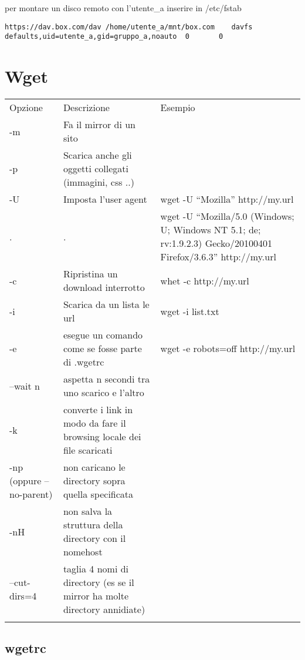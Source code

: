 \documentclass[]{article}
\begin{document}
per montare un disco remoto con l'utente\_a inserire in /etc/fstab

\begin{verbatim}
https://dav.box.com/dav /home/utente_a/mnt/box.com    davfs   defaults,uid=utente_a,gid=gruppo_a,noauto  0       0
\end{verbatim}

\section{Wget}\label{wget}

\begin{longtable}[l]{@{}lll@{}}
\toprule\addlinespace
Opzione & Descrizione & Esempio
\\\addlinespace
\midrule\endhead
-m & Fa il mirror di un sito
\\\addlinespace
-p & Scarica anche gli oggetti collegati (immagini, css ..)
\\\addlinespace
-U & Imposta l'user agent & wget -U ``Mozilla'' http://my.url
\\\addlinespace
. & . & wget -U ``Mozilla/5.0 (Windows; U; Windows NT 5.1; de;
rv:1.9.2.3) Gecko/20100401 Firefox/3.6.3'' http://my.url
\\\addlinespace
-c & Ripristina un download interrotto & whet -c http://my.url
\\\addlinespace
-i & Scarica da un lista le url & wget -i list.txt
\\\addlinespace
-e & esegue un comando come se fosse parte di .wgetrc & wget -e
robots=off http://my.url
\\\addlinespace
--wait n & aspetta n secondi tra uno scarico e l'altro
\\\addlinespace
-k & converte i link in modo da fare il browsing locale dei file
scaricati
\\\addlinespace
-np (oppure --no-parent) & non caricano le directory sopra quella
specificata
\\\addlinespace
-nH & non salva la struttura della directory con il nomehost
\\\addlinespace
--cut-dirs=4 & taglia 4 nomi di directory (es se il mirror ha molte
directory annidiate)
\\\addlinespace
\bottomrule
\end{longtable}

\subsection{wgetrc}\label{wgetrc}
\end{document}
